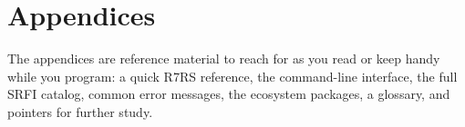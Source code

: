 \documentclass[11pt,twoside,openright]{memoir}
\begin{document}




\appendix
\part{Appendices}

The appendices are reference material to reach for as you read or keep handy while you program: a quick R7RS reference, the command-line interface, the full SRFI catalog, common error messages, the ecosystem packages, a glossary, and pointers for further study.









\backmatter

\printindex
\end{document}
